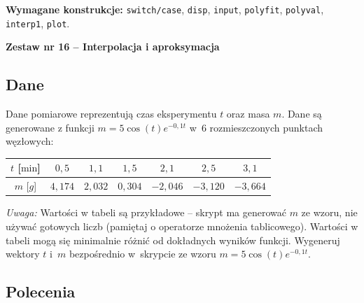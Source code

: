 \documentclass[a4paper,11pt]{article}
\begin{document}
\vspace{0.3cm}
\begin{ramka}
\textbf{Wymagane konstrukcje:}
\texttt{switch/case}, \texttt{disp}, \texttt{input}, \texttt{polyfit}, \texttt{polyval}, \texttt{interp1}, \texttt{plot}.
\end{ramka}

\clearpage
\begin{center}
  {\large\bfseries Zestaw nr 16 \quad -- \quad Interpolacja i aproksymacja}
\end{center}
\hrulefill
\vspace{0.4cm}

\subsection*{Dane}

Dane pomiarowe reprezentują czas eksperymentu $t$ oraz masa $m$.
Dane są generowane z funkcji $m = 5\cos(t)e^{-0{,}1t}$ w~6 rozmieszczonych punktach węzłowych:

\begin{center}
\begin{tabular}{c|cccccc}
  \toprule
  $t$ [$\text{min}$] & $0{,}5$ & $1{,}1$ & $1{,}5$ & $2{,}1$ & $2{,}5$ & $3{,}1$ \\
  \midrule
  $m$ [$g$] & $4{,}174$ & $2{,}032$ & $0{,}304$ & $-2{,}046$ & $-3{,}120$ & $-3{,}664$ \\
  \bottomrule
\end{tabular}
\end{center}

\medskip
\textit{Uwaga:} Wartości w tabeli są przykładowe – skrypt ma generować $m$ ze wzoru, nie używać gotowych liczb (pamiętaj o operatorze mnożenia tablicowego). Wartości w tabeli mogą się minimalnie różnić od dokładnych wyników funkcji.
Wygeneruj wektory $t$ i~$m$ bezpośrednio w~skrypcie ze wzoru $m = 5\cos(t)e^{-0{,}1t}$.

\subsection*{Polecenia}
\end{document}
